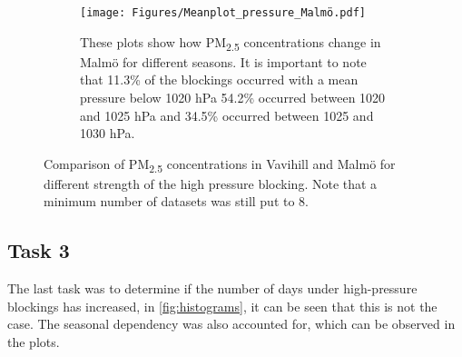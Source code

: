 \begin{figure}[H]
    \hfill
    \begin{subfigure}[b]{0.49\textwidth}
        \centering
        \texttt{[image: Figures/Meanplot\_pressure\_Malmö.pdf]}
        \caption{These plots show how PM\textsubscript{2.5} concentrations change in Malmö for different seasons. It is important to note that 11.3\% of the blockings occurred with a mean pressure below 1020 hPa 54.2\% occurred between 1020 and 1025 hPa and 34.5\% occurred between 1025 and 1030 hPa.}
        \label{fig:Meanplot_pressure_Malmö}
    \end{subfigure}
    \caption{Comparison of PM\textsubscript{2.5} concentrations in Vavihill and Malmö for different strength of the high pressure blocking. Note that a minimum number of datasets was still put to 8. }
    \label{fig:PM25_blocking_strength}
\end{figure}

\subsection{Task 3}
The last task was to determine if the number of days under high-pressure blockings has increased, in \autoref{fig:histograms}, it can be seen that this is not the case. The seasonal dependency was also accounted for, which can be observed in the plots.


